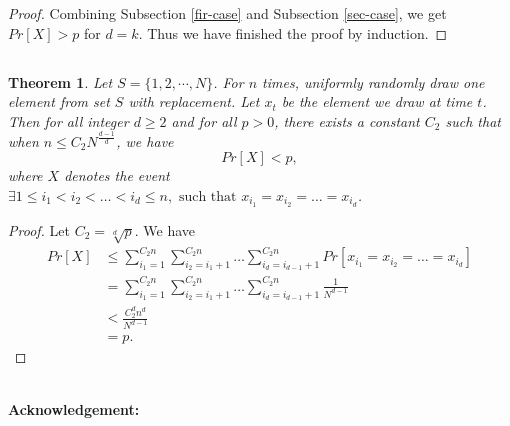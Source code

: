 \documentclass{article}
\newcommand{\Acknowledgement}[1]{\ \\{\bf Acknowledgement:} #1}
\newtheorem{theorem}{Theorem}
\begin{document}
\begin{spacing}{1.1}
\begin{proof}
    Combining Subsection \ref{fir-case} and Subsection \ref{sec-case}, we get $Pr[X] > p$ for $d = k$. Thus we have finished the proof by induction.
    \end{proof}


    \subsection{}

    \begin{theorem}

    Let $S = \{1, 2, \cdots, N\}$. For $n$ times, uniformly randomly draw one element from set $S$ with replacement. Let $x_t$ be the element we draw at time $t$. Then for all integer $d\geq 2$ and for all $p > 0$, there exists a constant $C_2$ such that when $n \leq C_2 {N}^{\frac{d-1}{d}}$, we have
    $$Pr[X] < p,$$
    where $X$ denotes the event $\exists 1\leq i_1< i_2<\dots<i_d \leq n, \text{ such that } x_{i_1} = x_{i_2}=\dots=x_{i_d}$.

    \end{theorem}

    \begin{proof}

    Let $C_2=\sqrt[d]{p}$. We have
    \begin{align*}
    Pr[X]
    &\leq \sum_{i_1=1}^{C_2n}\sum_{i_2=i_1+1}^{C_2n}\dots\sum_{i_d=i_{d-1}+1}^{C_2n}Pr[x_{i_1} = x_{i_2}=\dots=x_{i_d}]  \\
    &=\sum_{i_1=1}^{C_2n}\sum_{i_2=i_1+1}^{C_2n}\dots\sum_{i_d=i_{d-1}+1}^{C_2n}\frac{1}{N^{d-1}}  \\
    &<\frac{C_2^dn^d}{N^{d-1}}  \\
    &=p.
    \end{align*}

    \end{proof}


    \Acknowledgement{}


    \end{spacing}
    
\end{document}
